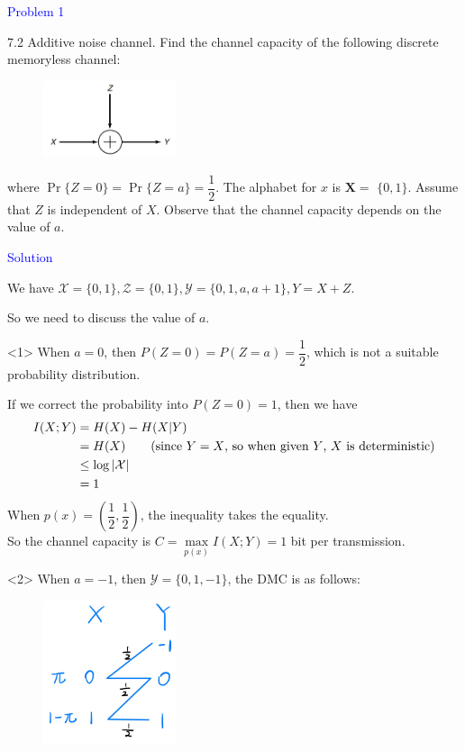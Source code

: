 \textcolor{blue}{Problem 1}

7.2 Additive noise channel. Find the channel capacity of the following discrete memoryless channel:
\begin{figure}[htbp]
    \centering
	\includegraphics[width=0.35\textwidth]{../figures/7.2.png}
\end{figure}

where $\operatorname{Pr}\{Z=0\}=\operatorname{Pr}\{Z=a\}=\dfrac{1}{2}$. The alphabet for $x$ is $\mathbf{X}=$ $\{0,1\}$. Assume that $Z$ is independent of $X$. Observe that the channel capacity depends on the value of $a$.

\textcolor{blue}{Solution}

We have $\mathcal{X}=\{0,1\}, \mathcal{Z}=\{0,1\}, \mathcal{Y}=\{0,1,a,a+1\}, Y=X+Z$.

So we need to discuss the value of $a$.

<1> When $a=0$, then $P(Z=0)=P(Z=a)=\dfrac{1}{2}$, which is not a suitable probability distribution.

If we correct the probability into $P(Z=0)=1$, then we have
\begin{align*}
I(X;Y) &= H(X)-H(X|Y) \\
&= H(X) \text{\qquad (since $Y=X$, so when given $Y$, $X$ is deterministic)} \\
&\leq \log \left|\mathcal{X}\right| \\
&= 1
\end{align*}
When $p(x)=\left(\dfrac{1}{2},\dfrac{1}{2}\right)$, the inequality takes the equality. \\
So the channel capacity is $C=\max\limits_{p(x)}I(X;Y)=1$ bit per transmission.

<2> When $a=-1$, then $\mathcal{Y}= \{0,1,-1\}$, the DMC is as follows:
\begin{figure}[htbp]
    \centering
	\includegraphics[width=0.35\textwidth]{../figures/7.2_-1.png}
\end{figure}

